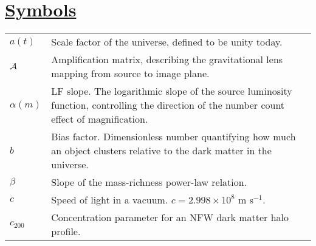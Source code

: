 \section*{\underline{Symbols}}
\begin{tabular}{p{0.6in}p{5.8in}}

$a(t)$ & Scale factor of the universe, defined to be unity today. \\
$\cal{A}$ & Amplification matrix, describing the gravitational lens mapping from source to image plane. \\
$\alpha(m)$ & \acs{LF} slope. The logarithmic slope of the source luminosity function, controlling the direction of the number count effect of magnification. \\
$b$ & Bias factor. Dimensionless number quantifying how much an object clusters relative to the dark matter in the universe. \\ 
$\beta$ & Slope of the mass-richness power-law relation. \\
$c$ & Speed of light in a vacuum. $c = 2.998 \times 10^8$ m s$^{-1}$. \\
$c_{200}$ & Concentration parameter for an \acs{NFW} dark matter halo profile. \\

\end{tabular}
